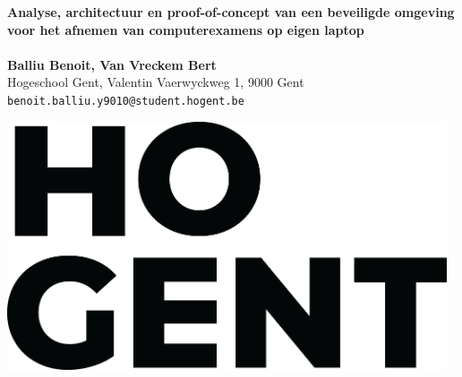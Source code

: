 \documentclass[a0,portrait]{a0poster}
\begin{document}


\begin{minipage}[t]{0.75\linewidth}
\VeryHuge \color{HoGentAccent1} \textbf{Analyse, architectuur en proof-of-concept van een beveiligde omgeving voor het afnemen van computerexamens op eigen laptop} \color{Black}\\ %
\\
\huge \textbf{Balliu Benoit, Van Vreckem Bert}\\[0.5cm] %
\huge Hogeschool Gent, Valentin Vaerwyckweg 1, 9000 Gent\\[0.4cm] %
\Large \texttt{benoit.balliu.y9010@student.hogent.be} \\
\end{minipage}
%
\begin{minipage}[t]{0.25\linewidth}
\includegraphics[width=13cm,right]{figures/HOGENT_Logo_Pos_rgb.png} 

\end{minipage}

\vspace{1cm} %

\end{document}

